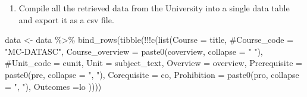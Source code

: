 \documentclass[
  letterpaper,
]{report}
\newenvironment{Shaded}{\begin{snugshade}}{\end{snugshade}}
\newcommand{\AttributeTok}[1]{\textcolor[rgb]{0.40,0.45,0.13}{#1}}
\newcommand{\CommentTok}[1]{\textcolor[rgb]{0.37,0.37,0.37}{#1}}
\newcommand{\ControlFlowTok}[1]{\textcolor[rgb]{0.00,0.23,0.31}{#1}}
\newcommand{\DecValTok}[1]{\textcolor[rgb]{0.68,0.00,0.00}{#1}}
\newcommand{\FunctionTok}[1]{\textcolor[rgb]{0.28,0.35,0.67}{#1}}
\newcommand{\NormalTok}[1]{\textcolor[rgb]{0.00,0.23,0.31}{#1}}
\newcommand{\OtherTok}[1]{\textcolor[rgb]{0.00,0.23,0.31}{#1}}
\newcommand{\SpecialCharTok}[1]{\textcolor[rgb]{0.37,0.37,0.37}{#1}}
\newcommand{\StringTok}[1]{\textcolor[rgb]{0.13,0.47,0.30}{#1}}
\providecommand{\tightlist}{%
  \setlength{\itemsep}{0pt}\setlength{\parskip}{0pt}}\usepackage{longtable,booktabs,array}
\begin{document}
\begin{Shaded}
\end{Shaded}

\begin{enumerate}
\def\labelenumi{\arabic{enumi}.}
\setcounter{enumi}{5}
\tightlist
\item
  Compile all the retrieved data from the University into a single data
  table and export it as a csv file.
\end{enumerate}

\begin{Shaded}
\begin{Highlighting}[]
\NormalTok{data }\OtherTok{\textless{}{-}}\NormalTok{ data }\SpecialCharTok{\%\textgreater{}\%} 
        \FunctionTok{bind\_rows}\NormalTok{(}\FunctionTok{tibble}\NormalTok{(}\SpecialCharTok{!!!}\FunctionTok{c}\NormalTok{(}\FunctionTok{list}\NormalTok{(}\AttributeTok{Course =}\NormalTok{ title, }
                                   \CommentTok{\#Course\_code = "MC{-}DATASC", }
                                   \AttributeTok{Course\_overview =} \FunctionTok{paste0}\NormalTok{(coverview, }\AttributeTok{collapse =} \StringTok{" "}\NormalTok{),}
                                   \CommentTok{\#Unit\_code = cunit,}
                                   \AttributeTok{Unit =}\NormalTok{ subject\_text,}
                                   \AttributeTok{Overview =}\NormalTok{ overview,}
                                   \AttributeTok{Prerequisite =} \FunctionTok{paste0}\NormalTok{(pre, }\AttributeTok{collapse =} \StringTok{", "}\NormalTok{),}
                                   \AttributeTok{Corequisite =}\NormalTok{ co,}
                                   \AttributeTok{Prohibition =} \FunctionTok{paste0}\NormalTok{(pro, }\AttributeTok{collapse =} \StringTok{", "}\NormalTok{),}
                                   \AttributeTok{Outcomes =}\NormalTok{lo}
\NormalTok{                                   ))))}
\end{Highlighting}
\end{Shaded}
\end{document}
